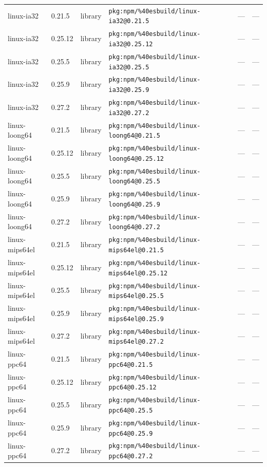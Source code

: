 \documentclass[11pt]{article}
\begin{document}
\begin{longtable}{|l|l|l|p{2.2cm}|l|p{4cm}|}
linux-ia32 & 0.21.5 & library & \texttt{pkg:npm/\%40esbuild/linux-ia32@0.21.5} & — & — \\
linux-ia32 & 0.25.12 & library & \texttt{pkg:npm/\%40esbuild/linux-ia32@0.25.12} & — & — \\
linux-ia32 & 0.25.5 & library & \texttt{pkg:npm/\%40esbuild/linux-ia32@0.25.5} & — & — \\
linux-ia32 & 0.25.9 & library & \texttt{pkg:npm/\%40esbuild/linux-ia32@0.25.9} & — & — \\
linux-ia32 & 0.27.2 & library & \texttt{pkg:npm/\%40esbuild/linux-ia32@0.27.2} & — & — \\
linux-loong64 & 0.21.5 & library & \texttt{pkg:npm/\%40esbuild/linux-loong64@0.21.5} & — & — \\
linux-loong64 & 0.25.12 & library & \texttt{pkg:npm/\%40esbuild/linux-loong64@0.25.12} & — & — \\
linux-loong64 & 0.25.5 & library & \texttt{pkg:npm/\%40esbuild/linux-loong64@0.25.5} & — & — \\
linux-loong64 & 0.25.9 & library & \texttt{pkg:npm/\%40esbuild/linux-loong64@0.25.9} & — & — \\
linux-loong64 & 0.27.2 & library & \texttt{pkg:npm/\%40esbuild/linux-loong64@0.27.2} & — & — \\
linux-mips64el & 0.21.5 & library & \texttt{pkg:npm/\%40esbuild/linux-mips64el@0.21.5} & — & — \\
linux-mips64el & 0.25.12 & library & \texttt{pkg:npm/\%40esbuild/linux-mips64el@0.25.12} & — & — \\
linux-mips64el & 0.25.5 & library & \texttt{pkg:npm/\%40esbuild/linux-mips64el@0.25.5} & — & — \\
linux-mips64el & 0.25.9 & library & \texttt{pkg:npm/\%40esbuild/linux-mips64el@0.25.9} & — & — \\
linux-mips64el & 0.27.2 & library & \texttt{pkg:npm/\%40esbuild/linux-mips64el@0.27.2} & — & — \\
linux-ppc64 & 0.21.5 & library & \texttt{pkg:npm/\%40esbuild/linux-ppc64@0.21.5} & — & — \\
linux-ppc64 & 0.25.12 & library & \texttt{pkg:npm/\%40esbuild/linux-ppc64@0.25.12} & — & — \\
linux-ppc64 & 0.25.5 & library & \texttt{pkg:npm/\%40esbuild/linux-ppc64@0.25.5} & — & — \\
linux-ppc64 & 0.25.9 & library & \texttt{pkg:npm/\%40esbuild/linux-ppc64@0.25.9} & — & — \\
linux-ppc64 & 0.27.2 & library & \texttt{pkg:npm/\%40esbuild/linux-ppc64@0.27.2} & — & — \\

\end{longtable}
\end{document}
